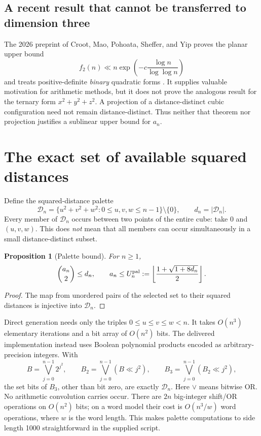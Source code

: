 \documentclass[11pt,letterpaper]{article}
\newtheorem{proposition}[theorem]{Proposition}
\theoremstyle{definition}
\newcommand{\floor}[1]{\left\lfloor #1\right\rfloor}
\newcommand{\calD}{\mathcal D}
\begin{document}
\subsection{A recent result that cannot be transferred to dimension three}
The 2026 preprint of Croot, Mao, Pohoata, Sheffer, and Yip proves the
planar upper bound
\[
 f_2(n)\ll n\exp\!\left(-c\frac{\log n}{\log\log n}\right)
\]
and treats positive-definite \emph{binary} quadratic forms
\cite{croot2026}. It supplies valuable motivation for arithmetic methods,
but it does not prove the analogous result for the ternary form
\(x^2+y^2+z^2\). A projection of a distance-distinct cubic configuration
need not remain distance-distinct. Thus neither that theorem nor
projection justifies a sublinear upper bound for \(a_n\).

\section{The exact set of available squared distances}
\label{sec:palette}
Define the squared-distance palette
\[
 \calD_n=
 \{u^2+v^2+w^2:0\le u,v,w\le n-1\}\setminus\{0\},
 \qquad d_n=|\calD_n|.
\]
Every member of \(\calD_n\) occurs between two points of the entire cube:
take \(0\) and \((u,v,w)\). This does \emph{not} mean that all members
can occur simultaneously in a small distance-distinct subset.

\begin{proposition}[Palette bound]
\label{prop:palette}
For \(n\ge1\),
\[
 \binom{a_n}{2}\le d_n,\qquad
 a_n\le U_n^{\rm pal}:=
 \floor{\frac{1+\sqrt{1+8d_n}}2}.
\]
\end{proposition}
\begin{proof}
The map from unordered pairs of the selected set to their squared
distances is injective into \(\calD_n\).
\end{proof}

Direct generation needs only the triples \(0\le u\le v\le w<n\).
It takes \(O(n^3)\) elementary iterations and a bit array of \(O(n^2)\)
bits. The delivered implementation instead uses Boolean polynomial
products encoded as arbitrary-precision integers. With
\[
 B=\bigvee_{j=0}^{n-1}2^{j^2},\qquad
 B_2=\bigvee_{j=0}^{n-1}(B\ll j^2),\qquad
 B_3=\bigvee_{j=0}^{n-1}(B_2\ll j^2),
\]
the set bits of \(B_3\), other than bit zero, are exactly \(\calD_n\).
Here \(\vee\) means bitwise OR. No arithmetic convolution carries occur.
There are \(2n\) big-integer shift/OR operations on \(O(n^2)\) bits;
on a word model their cost is \(O(n^3/w)\) word operations, where \(w\)
is the word length. This makes palette computations to side length
1000 straightforward in the supplied script.
\end{document}
